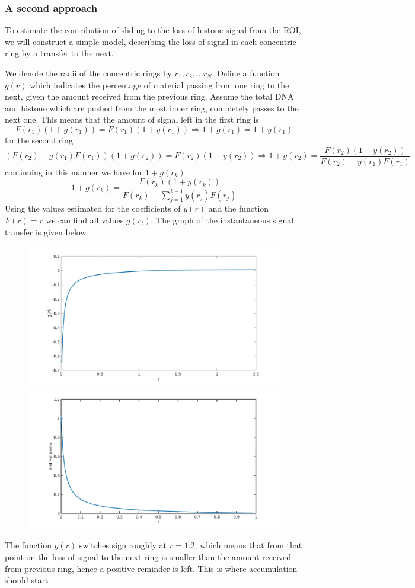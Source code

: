 \documentclass[12pt]{report}
\begin{document}
\subsubsection{A second approach}
To estimate the contribution of sliding to the loss of histone signal from the ROI, we will construct a simple model, describing the loss of signal in each concentric ring by a transfer to the next. 

We denote the radii of the concentric rings by $r_1,r_2,...r_N$. Define a function $g(r)$ which indicates the percentage of material passing from one ring to the next, given the amount received from the previous ring. Assume the total DNA and histone which are pushed from the most inner ring, completely passes to the next one. This means that the amount of signal left in the first ring is
\begin{equation*}
F(r_1)(1+g(r_1)) = F(r_1)(1+y(r_1)) \Rightarrow 1+g(r_1)=1+y(r_1)
\end{equation*}
for the second ring 
\begin{equation*}
(F(r_2)-g(r_1)F(r_1))(1+g(r_2))= F(r_2)(1+y(r_2))\Rightarrow 1+g(r_2)=\frac{F(r_2)(1+y(r_2))}{F(r_2)-y(r_1)F(r_1)} 
\end{equation*}
continuing in this manner we have for $1+g(r_k)$
\begin{equation*}
1+g(r_k) =\frac{F(r_k)(1+y(r_k))}{F(r_k)-\sum_{j=1}^{k-1}y(r_j)F(r_j)} 
\end{equation*} 
Using the values estimated for the coefficients of $y(r)$ and the function $F(r)=r$  we can find all values $g(r_i)$. 
The graph of the instantaneous signal transfer is given below  

\begin{figure}[H]
\includegraphics[width=0.5\linewidth, height=0.3\textheight]{Images/patchExpansion/instantaneousLossGainFunction}
\includegraphics[width=0.5\linewidth, height=0.3\textheight]{Images/patchExpansion/KMEstimatorForSignalLoss}
\caption{}
\label{fig:instantaneousLossGainFunction}
\end{figure}
The function $g(r)$ switches sign roughly at $r=1.2$, which means that from that point on the loss of signal to the next ring is smaller than the amount received from previous ring, hence a positive reminder is left. This is where accumulation should start
\end{document}
